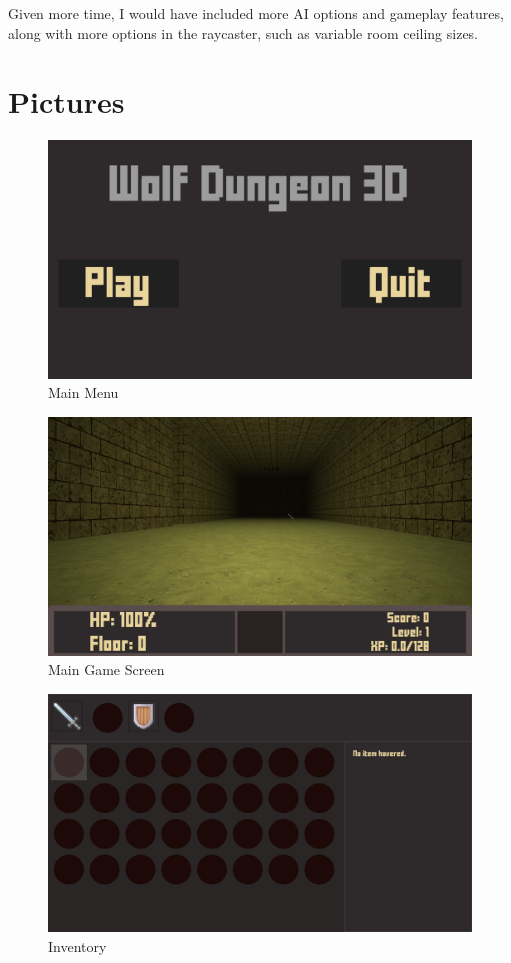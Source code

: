 \documentclass[11pt]{article}
\begin{document}
Given more time, I would have included more AI options and gameplay features, along with more options in the raycaster, such
as variable room ceiling sizes.

\section{Pictures}
\label{sec:orgb28ba4b}
\begin{figure}[htbp]
\centering
\includegraphics[width=.9\linewidth]{./mainMenu.png}
\caption{Main Menu}
\end{figure}

\begin{figure}[htbp]
\centering
\includegraphics[width=.9\linewidth]{./mainGame.png}
\caption{Main Game Screen}
\end{figure}

\begin{figure}[htbp]
\centering
\includegraphics[width=.9\linewidth]{./inventory.png}
\caption{Inventory}
\end{figure}
\end{document}
